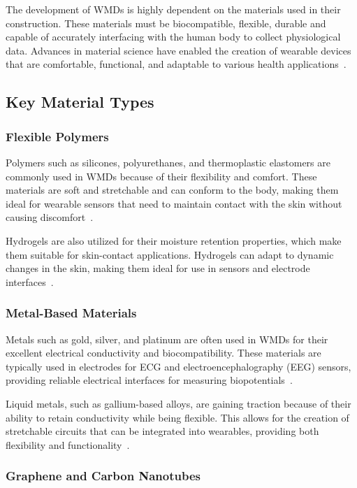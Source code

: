 \documentclass[journal]{IEEEtran}
\begin{document}
The development of WMDs is highly dependent on the materials used in their construction. These materials must be biocompatible, flexible, durable and capable of accurately interfacing with the human body to collect physiological data. Advances in material science have enabled the creation of wearable devices that are comfortable, functional, and adaptable to various health applications~\cite{Luo2024}.

    \subsection{Key Material Types}

        \subsubsection{Flexible Polymers}

        Polymers such as silicones, polyurethanes, and thermoplastic elastomers are commonly used in WMDs because of their flexibility and comfort. These materials are soft and stretchable and can conform to the body, making them ideal for wearable sensors that need to maintain contact with the skin without causing discomfort~\cite{Trovato2022, Tsikriteas2021}.

        Hydrogels are also utilized for their moisture retention properties, which make them suitable for skin-contact applications. Hydrogels can adapt to dynamic changes in the skin, making them ideal for use in sensors and electrode interfaces~\cite{Trovato2022}.

        \subsubsection{Metal-Based Materials}

        Metals such as gold, silver, and platinum are often used in WMDs for their excellent electrical conductivity and biocompatibility. These materials are typically used in electrodes for ECG and electroencephalography (EEG) sensors, providing reliable electrical interfaces for measuring biopotentials~\cite{Kim2017}.

        Liquid metals, such as gallium-based alloys, are gaining traction because of their ability to retain conductivity while being flexible. This allows for the creation of stretchable circuits that can be integrated into wearables, providing both flexibility and functionality~\cite{Lu2020}.

        \subsubsection{Graphene and Carbon Nanotubes}
\end{document}

